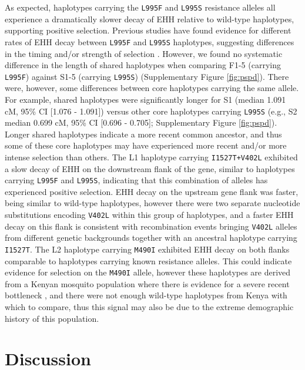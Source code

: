 \documentclass[a4paper,11pt,abstracton,hidelinks]{scrartcl}
\begin{document}
%
As expected, haplotypes carrying the \texttt{L995F} and \texttt{L995S} resistance alleles all experience a dramatically slower decay of EHH relative to wild-type haplotypes, supporting positive selection.
%
Previous studies have found evidence for different rates of EHH decay between \texttt{L995F} and \texttt{L995S} haplotypes,
suggesting differences in the timing and/or strength of selection \cite{Lynd2010}.
%
However, we found no systematic difference in the length of shared haplotypes when comparing F1-5 (carrying \texttt{L995F}) against S1-5 (carrying \texttt{L995S}) (Supplementary Figure \ref{fig:pspd}).
%
There were, however, some differences between core haplotypes carrying the same allele.
%
For example, shared haplotypes were significantly longer for S1 (median 1.091 cM, 95\% CI [1.076 - 1.091]) versus other core haplotypes carrying \texttt{L995S} (e.g., S2 median 0.699 cM, 95\% CI [0.696 - 0.705]; Supplementary Figure \ref{fig:pspd}).
%
Longer shared haplotypes indicate a more recent common ancestor, and thus some of these core haplotypes may have experienced more recent and/or more intense selection than others.
%
The L1 haplotype carrying \texttt{I1527T+V402L} exhibited a slow decay of EHH on the downstream flank of the gene, similar to haplotypes carrying \texttt{L995F} and \texttt{L995S}, indicating that this combination of alleles has experienced positive selection.
%
EHH decay on the upstream gene flank was faster, being similar to wild-type haplotypes, however there were two separate nucleotide substitutions encoding \texttt{V402L} within this group of haplotypes, and a faster EHH decay on this flank is consistent with recombination events bringing \texttt{V402L} alleles from different genetic backgrounds together with an ancestral haplotype carrying \texttt{I1527T}.
%
The L2 haplotype carrying \texttt{M490I} exhibited EHH decay on both flanks comparable to haplotypes carrying known resistance alleles.
%
This could indicate evidence for selection on the \texttt{M490I} allele, however these haplotypes are derived from a Kenyan mosquito population where there is evidence for a severe recent bottleneck \cite{Ag1000gConsortium2017}, and there were not enough wild-type haplotypes from Kenya with which to compare, thus this signal may also be due to the extreme demographic history of this population.


\section*{Discussion}
\end{document}
